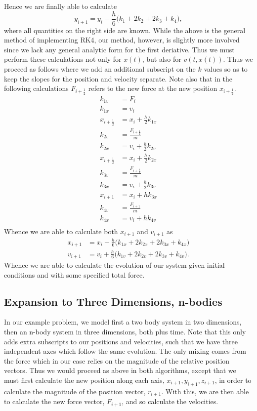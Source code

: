 \documentclass[11pt,a4paper]{article}
\begin{document}
Hence we are finally able to calculate
\begin{equation}
y_{i+1} = y_i + \frac{h}{6}\big(k_1 + 2k_2 + 2k_3 + k_4\big),
\end{equation}
where all quantities on the right side are known. 
	While the above is the general method of implementing RK4, our method, however, is slightly more involved since we lack any general analytic form for the first deriative. Thus we must perform these calculations not only for $x(t)$, but also for $v(t,x(t))$. Thus we proceed as follows where we add an additional subscript on the $k$ values so as to keep the slopes for the position and velocity separate. Note also that in the following calculations $F_{i+\frac{1}{2}}$ refers to the new force at the new position $x_{i+\frac{1}{2}}$.
\begin{align}
k_{1v} & = F_i \\
k_{1x} &= v_i \\
x_{i+\frac{1}{2}} &= x_i + \frac{h}{2}k_{1x} \\
k_{2v} &= \frac{F_{i+\frac{1}{2}}}{m} \\
k_{2x} &= v_i + \frac{h}{2}k_{2v} \\
x_{i+\frac{1}{2}} &= x_i + \frac{h}{2}k_{2x} \\
k_{3v} &= \frac{F_{i+\frac{1}{2}}}{m} \\
k_{3x} &= v_i + \frac{h}{2}k_{3v} \\
x_{i+1} &= x_i + hk_{3x} \\
k_{4v} &= \frac{F_{i+1}}{m} \\
k_{4x} &= v_i + hk_{4v} \\
\end{align}
Whence we are able to calculate both $x_{i+1}$ and $v_{i+1}$ as
\begin{align}
x_{i+1} &= x_i + \frac{h}{6}\big(k_{1x} + 2k_{2x} + 2k_{3x} + k_{4x}\big) \\
v_{i+1} &= v_i + \frac{h}{6}\big(k_{1v} + 2k_{2v} + 2k_{3v} + k_{4v}\big).
\end{align}
Whence we are able to calculate the evolution of our system given initial conditions and with some specified total force. 

\subsection{Expansion to Three Dimensions, n-bodies}

In our example problem, we model first a two body system in two dimensions, then an n-body system in three dimensions, both plus time. Note that this only adds extra subscripts to our positions and velocities, such that we have three independent axes which follow the same evolution. The only mixing comes from the force which in our case relies on the magnitude of the relative position vectors. Thus we would proceed as above in both algorithms, except that we must first calculate the new position along each axis, $x_{i+1}, y_{i+1}, z_{i+1}$, in order to calculate the magnitude of the position vector, $r_{i+1}$. With this, we are then able to calculate the new force vector, $F_{i+1}$, and so calculate the velocities. 
\end{document}
